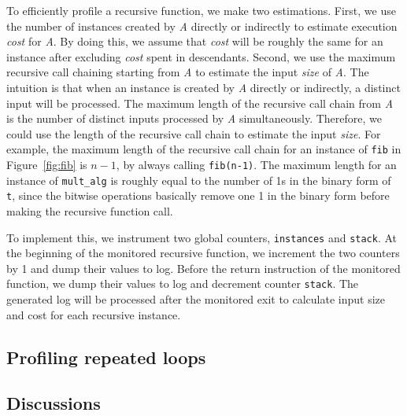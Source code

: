 To efficiently profile a recursive function, 
we make two estimations.
First, we use the number of instances created by \textit{A} directly or indirectly 
to estimate execution \textit{cost} for \textit{A}.
By doing this, we assume that \textit{cost} 
will be roughly the same for an instance after excluding 
\textit{cost} spent in descendants.
Second, we use the maximum recursive call chaining starting from \textit{A} to estimate
the input \textit{size} of \textit{A}. 
The intuition is that 
when an instance is created by \textit{A} directly or indirectly, 
a distinct input will be processed.
The maximum length of the recursive call chain from \textit{A} 
is the number of distinct inputs processed by \textit{A} simultaneously.
Therefore, we could use the length of 
the recursive call chain to estimate the input \textit{size}. 
For example, 
the maximum length of the recursive call chain for an instance of \texttt{fib} 
in Figure~\ref{fig:fib} is $n-1$, by always calling \texttt{fib(n-1)}.
The maximum length for an instance of \texttt{mult\_alg} 
is roughly equal to the number of 1s in the binary form of \texttt{t},
since the bitwise operations basically remove one 1 in the binary 
form before making the recursive function call.  

To implement this, 
we instrument two global counters, \texttt{instances} and \texttt{stack}. 
At the beginning of the monitored recursive function, 
we increment the two counters by 1 and dump their values to log.
Before the return instruction of the monitored function, 
we dump their values to log and decrement counter \texttt{stack}.
The generated log will be processed after the monitored 
exit to calculate input size and cost for each recursive instance. 



\subsection{Profiling repeated loops}


\subsection{Discussions}

